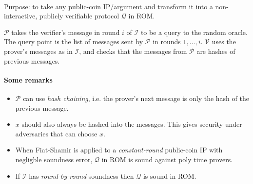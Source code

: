 \documentclass[11pt]{article}
\newcommand{\verifier}{$\mathcal{V}$ }
\newcommand{\prover}{$\mathcal{P}$ }
\begin{document}
\paragraph*{} Purpose: to take any public-coin IP/argument and transform it into a non-interactive, publicly verifiable protocol $\mathcal{Q}$ in ROM.

\begin{definition}
    \prover takes the verifier's message in round $i$ of $\mathcal{I}$ to be a query to the random oracle. The query point is the list of messages sent by \prover in rounds $1, \ldots, i$. \verifier uses the prover's messages as in $\mathcal{I}$, and checks that the messages from \prover are hashes of previous messages.
\end{definition}

\paragraph{Some remarks}
\begin{itemize}
    \item \prover can use \textit{hash chaining}, i.e. the prover's next message is only the hash of the previous message.
    \item $x$ should also always be hashed into the messages. This gives security under adversaries that can choose $x$.
    \item When Fiat-Shamir is applied to a \textit{constant-round} public-coin IP with negligble soundness error, $\mathcal{Q}$ in ROM is sound against poly time provers.
    \item If $\mathcal{I}$ has \textit{round-by-round} soundness then $\mathcal{Q}$ is sound in ROM.
\end{itemize}



\end{document}

